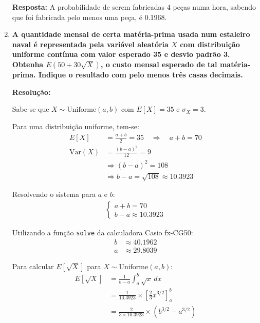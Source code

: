 \documentclass[a4paper,12pt]{article}
\begin{document}
\begin{enumerate}
\begin{mdframed}[backgroundcolor=gray!10, linewidth=0pt, innertopmargin=10pt, innerbottommargin=10pt]
  \textbf{Resposta:} A probabilidade de serem fabricadas 4 peças numa hora, sabendo que foi fabricada pelo menos uma peça, é 0.1968.
  \end{mdframed}

  \vspace{0.5cm}

  \item \textbf{A quantidade mensal de certa matéria-prima usada num estaleiro naval é representada pela variável aleatória $X$ com distribuição uniforme contínua com valor esperado 35 e desvio padrão 3. Obtenha $E(50 + 30\sqrt{X})$, o custo mensal esperado de tal matéria-prima. Indique o resultado com pelo menos três casas decimais.}

  \vspace{0.3cm}

  \begin{mdframed}[backgroundcolor=gray!10, linewidth=0pt, innertopmargin=10pt, innerbottommargin=10pt]
  \textbf{Resolução:}
  
  Sabe-se que $X \sim \text{Uniforme}(a, b)$ com $E[X] = 35$ e $\sigma_X = 3$. 
  
  Para uma distribuição uniforme, tem-se:
  \begin{align*}
      E[X] &= \frac{a + b}{2} = 35 \quad \Rightarrow \quad a + b = 70 \\
      \text{Var}(X) &= \frac{(b - a)^2}{12} = 9 \\
      &\Rightarrow (b - a)^2 = 108 \\
      &\Rightarrow b - a = \sqrt{108} \approx 10.3923
  \end{align*}

  Resolvendo o sistema para $a$ e $b$:
  \begin{align*}
      \begin{cases}
          a + b = 70 \\
          b - a \approx 10.3923
      \end{cases}
  \end{align*}
  
  Utilizando a função \texttt{solve} da calculadora Casio fx-CG50:
  \begin{align*}
      b &\approx 40.1962 \\
      a &\approx 29.8039
  \end{align*}

  Para calcular $E[\sqrt{X}]$ para $X \sim \text{Uniforme}(a, b)$:
  \begin{align*}
      E[\sqrt{X}] &= \frac{1}{b - a} \int_{a}^{b} \sqrt{x} \, dx \\
      &= \frac{1}{10.3923} \times \left[ \frac{2}{3} x^{3/2} \right]_{a}^{b} \\
      &= \frac{2}{3 \times 10.3923} \times \left( b^{3/2} - a^{3/2} \right)
  \end{align*}
  

\end{mdframed}
\end{enumerate}
\end{document}
